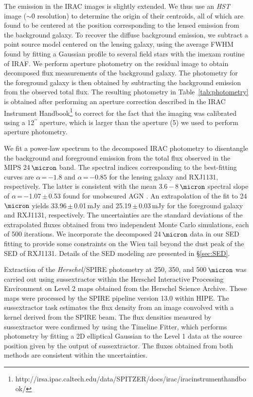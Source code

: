 \documentclass[]{emulateapj}
\newcommand{\Tab}[1]{Table~\ref{tab:#1}}
\newcommand{\Sec}[1]{\S\ref{sec:#1}}
\newcommand{\ncode}[1]{{\sc #1}}
\begin{document}
The emission in the IRAC images is slightly extended. We thus use an
{\it HST} image ($\sim$0 resolution) to determine the
origin of their centroids, all of which are found to be
centered at the position corresponding to the lensed emission from the
background galaxy. To recover the diffuse background emission, we subtract a
point source model centered on the lensing galaxy, using the average
FWHM found by fitting a Gaussian profile to several field stars
with the \ncode{imexam} routine of IRAF.
We perform aperture photometry on the residual image
to obtain decomposed flux measurements of the background galaxy.
The photometry for the foreground galaxy is then obtained
by subtracting the background emission from the
observed total flux. The resulting photometry in
\Tab{photometry} is obtained after performing an aperture correction
described in the IRAC Instrument Handbook\footnote{http://irsa.ipac.caltech.edu/data/SPITZER/docs/irac/iracinstrumenthandbook/} to
correct for the fact that the imaging was calibrated
using a 12$^{\prime\prime}$ aperture, which is larger than the aperture (5) we used to
perform aperture photometry.

We fit a power-law spectrum to the
decomposed IRAC photometry to disentangle the background and foreground
emission from the total flux observed in the MIPS 24\,$\micron$ band.
The spectral indices corresponding to the best-fitting curves are $\alpha$\,=\,$-1.8$ and
$\alpha$\,=\,$-0.85$ for the lensing galaxy and RXJ1131, respectively.
The latter
is consistent with the mean 3.6\,$-$\,8\,$\micron$
spectral slope of
$\alpha$\,=\,$-$1.07\,$\pm$\,0.53 found for unobscured AGN
\citep{Stern05a}. An extrapolation of the fit to 24\,$\micron$
yields 33.96\,$\pm$\,0.01\,mJy and 25.19\,$\pm$\,0.03\,mJy
for the foreground galaxy and RXJ1131, respectively.
The uncertainties are the standard deviations of
the extrapolated fluxes obtained from two independent Monte Carlo
simulations, each of 500 iterations.
We incorporate the decomposed 24\,$\micron$ data in our
SED fitting to provide some constraints on
the Wien tail beyond the dust peak
of the SED of RXJ1131.
Details of the SED modeling are presented in \Sec{SED}.

Extraction of the {\it Herschel}/SPIRE photometry at 250, 350, and 500\,$\micron$ was
carried out using \ncode{sussextractor} within the Herschel Interactive
Processing Environment \citep[HIPE;][]{Ott10a}
on Level 2 maps obtained from the Herschel Science Archive.
These maps were processed by the SPIRE pipeline
version 13.0 within HIPE. The \ncode{sussextractor} task estimates
the flux density from an image convolved with a kernel
derived from the SPIRE beam. The flux densities
measured by \ncode{sussextractor} were confirmed by
using the Timeline Fitter, which performs photometry
by fitting a 2D elliptical Gaussian to the Level 1 data at the
source position given by the output of \ncode{sussextractor}. The fluxes
obtained from both methods are consistent within the uncertainties.
\end{document}
